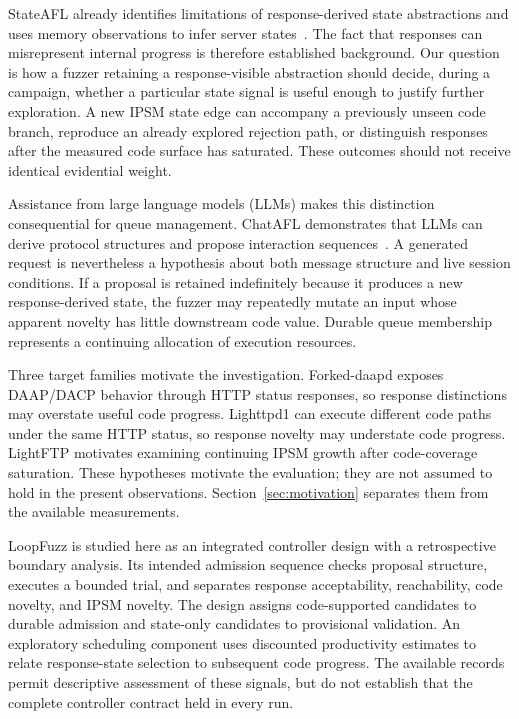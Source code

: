 \documentclass[final,5p,times,number]{elsarticle}
\begin{document}
StateAFL already identifies limitations of response-derived state abstractions and uses memory observations to infer server states~\cite{stateafl}. The fact that responses can misrepresent internal progress is therefore established background. Our question is how a fuzzer retaining a response-visible abstraction should decide, during a campaign, whether a particular state signal is useful enough to justify further exploration. A new IPSM state edge can accompany a previously unseen code branch, reproduce an already explored rejection path, or distinguish responses after the measured code surface has saturated. These outcomes should not receive identical evidential weight.

Assistance from large language models (LLMs) makes this distinction consequential for queue management. ChatAFL demonstrates that LLMs can derive protocol structures and propose interaction sequences~\cite{chatafl}. A generated request is nevertheless a hypothesis about both message structure and live session conditions. If a proposal is retained indefinitely because it produces a new response-derived state, the fuzzer may repeatedly mutate an input whose apparent novelty has little downstream code value. Durable queue membership represents a continuing allocation of execution resources.

Three target families motivate the investigation. Forked-daapd exposes DAAP/DACP behavior through HTTP status responses, so response distinctions may overstate useful code progress. Lighttpd1 can execute different code paths under the same HTTP status, so response novelty may understate code progress. LightFTP motivates examining continuing IPSM growth after code-coverage saturation. These hypotheses motivate the evaluation; they are not assumed to hold in the present observations. Section~\ref{sec:motivation} separates them from the available measurements.

LoopFuzz is studied here as an integrated controller design with a retrospective boundary analysis. Its intended admission sequence checks proposal structure, executes a bounded trial, and separates response acceptability, reachability, code novelty, and IPSM novelty. The design assigns code-supported candidates to durable admission and state-only candidates to provisional validation. An exploratory scheduling component uses discounted productivity estimates to relate response-state selection to subsequent code progress. The available records permit descriptive assessment of these signals, but do not establish that the complete controller contract held in every run.
\end{document}
